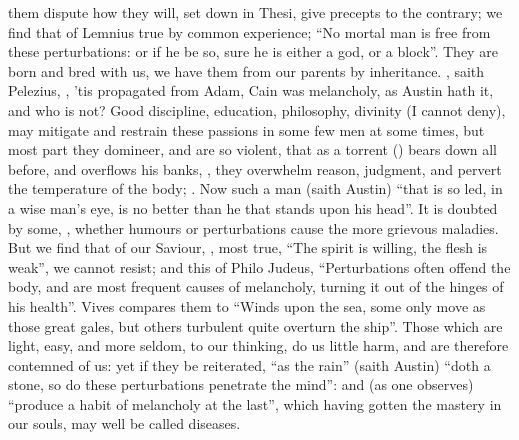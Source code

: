 them dispute how they will, set down in Thesi, give precepts to the contrary;
we find that of Lemnius true by common experience; \enquote{No
mortal man is free from these perturbations: or if he be so, sure he is either
a god, or a block}. They are born and bred with us, we have them from our
parents by inheritance. , saith
Pelezius, , 'tis
propagated from Adam, Cain was melancholy, as Austin hath
it, and who is not? Good discipline, education, philosophy, divinity (I cannot
deny), may mitigate and restrain these passions in some few men at some times,
but most part they domineer, and are so violent, that as a
torrent () bears down all before, and overflows
his banks, , they overwhelm reason, judgment, and pervert the temperature of the
body; .
Now such a man (saith Austin) \enquote{that is so led, in a wise
man's eye, is no better than he that stands upon his head}. It is doubted by
some, , whether
humours or perturbations cause the more grievous maladies. But we find that of
our Saviour, , most true, \enquote{The spirit is willing,
the flesh is weak}, we cannot resist; and this of Philo
Judeus, \enquote{Perturbations often offend the body, and are most frequent causes of
melancholy, turning it out of the hinges of his health}. Vives compares them to
\enquote{Winds upon the sea, some only move as those great gales,
but others turbulent quite overturn the ship}. Those which are light, easy, and
more seldom, to our thinking, do us little harm, and are therefore contemned of
us: yet if they be reiterated, \enquote{as the rain} (saith
Austin) \enquote{doth a stone, so do these perturbations penetrate the mind}:
and (as one observes) \enquote{produce a habit of melancholy at
the last}, which having gotten the mastery in our souls, may well be called
diseases.

